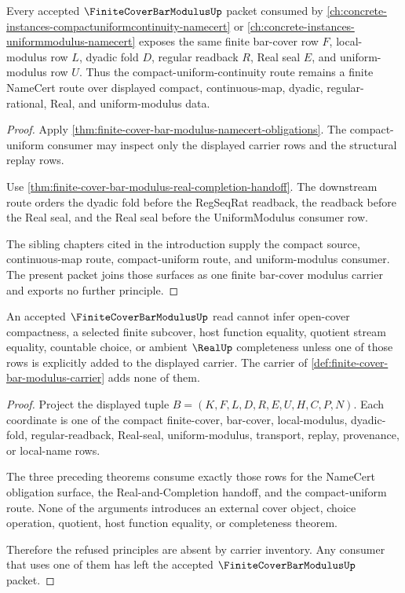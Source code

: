 \begin{theorem}
\label{thm:finite-cover-bar-modulus-compact-uniform-route}
Every accepted $\FiniteCoverBarModulusUp$ packet consumed by \autoref{ch:concrete-instances-compactuniformcontinuity-namecert} or \autoref{ch:concrete-instances-uniformmodulus-namecert} exposes the same finite bar-cover row $F$, local-modulus row $L$, dyadic fold $D$, regular readback $R$, Real seal $E$, and uniform-modulus row $U$. Thus the compact-uniform-continuity route remains a finite NameCert route over displayed compact, continuous-map, dyadic, regular-rational, Real, and uniform-modulus data.
\end{theorem}
\begin{proof}
Apply \autoref{thm:finite-cover-bar-modulus-namecert-obligations}. The compact-uniform consumer may inspect only the displayed carrier rows and the structural replay rows.

Use \autoref{thm:finite-cover-bar-modulus-real-completion-handoff}. The downstream route orders the dyadic fold before the RegSeqRat readback, the readback before the Real seal, and the Real seal before the UniformModulus consumer row.

The sibling chapters cited in the introduction supply the compact source, continuous-map route, compact-uniform route, and uniform-modulus consumer. The present packet joins those surfaces as one finite bar-cover modulus carrier and exports no further principle.
\end{proof}

\begin{theorem}
\label{thm:finite-cover-bar-modulus-nonescape}
An accepted $\FiniteCoverBarModulusUp$ read cannot infer open-cover compactness, a selected finite subcover, host function equality, quotient stream equality, countable choice, or ambient $\RealUp$ completeness unless one of those rows is explicitly added to the displayed carrier. The carrier of \autoref{def:finite-cover-bar-modulus-carrier} adds none of them.
\end{theorem}
\begin{proof}
Project the displayed tuple $B=(K,F,L,D,R,E,U,H,C,P,N)$. Each coordinate is one of the compact finite-cover, bar-cover, local-modulus, dyadic-fold, regular-readback, Real-seal, uniform-modulus, transport, replay, provenance, or local-name rows.

The three preceding theorems consume exactly those rows for the NameCert obligation surface, the Real-and-Completion handoff, and the compact-uniform route. None of the arguments introduces an external cover object, choice operation, quotient, host function equality, or completeness theorem.

Therefore the refused principles are absent by carrier inventory. Any consumer that uses one of them has left the accepted $\FiniteCoverBarModulusUp$ packet.
\end{proof}

